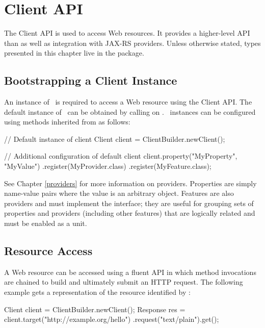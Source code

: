 \chapter{Client API}
\label{client_api}

The Client API is used to access Web resources. It provides a higher-level API than  as well as integration with JAX-RS providers. Unless otherwise stated, types presented in this chapter live in the  package.

\section{Bootstrapping a Client Instance}

An instance of \Client\ is required to access a Web resource using the Client API. The default instance of \Client\ can be obtained by calling  on \ClientBuilder. \Client\ instances can be configured using methods inherited from  as follows:

\begin{listing}{1}
// Default instance of client
Client client = ClientBuilder.newClient();

// Additional configuration of default client
client.property("MyProperty", "MyValue")
      .register(MyProvider.class)
      .register(MyFeature.class);
\end{listing}

See Chapter \ref{providers} for more information on providers. Properties are simply name-value pairs where the value is an arbitrary object.  Features are also providers and must implement the  interface; they are useful for grouping sets of properties and providers (including other features) that are logically related and must be enabled as a unit.

\section{Resource Access}
\label{resource_access}

A Web resource can be accessed using a fluent API in which method	 invocations are chained to build and ultimately submit an HTTP request. The following example gets a  representation of the resource identified by :

\begin{listing}{1}
Client client = ClientBuilder.newClient();
Response res = client.target("http://example.org/hello")
    .request("text/plain").get();
\end{listing}

